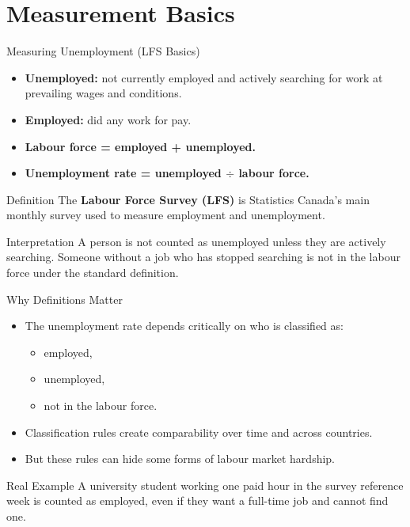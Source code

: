 \documentclass[aspectratio=169]{beamer}
\begin{document}
\section{Measurement Basics}

\begin{frame}{Measuring Unemployment (LFS Basics)}
\transfade
\begin{itemize}
  \item \textbf{Unemployed:} not currently employed and actively searching for work at prevailing wages and conditions.
  \item \textbf{Employed:} did any work for pay.
  \item \textbf{Labour force = employed + unemployed.}
  \item \textbf{Unemployment rate = unemployed \(\div\) labour force.}
\end{itemize}

\begin{block}{Definition}
The \textbf{Labour Force Survey (LFS)} is Statistics Canada's main monthly survey used to measure employment and unemployment.
\end{block}

\begin{block}{Interpretation}
A person is not counted as unemployed unless they are actively searching. Someone without a job who has stopped searching is not in the labour force under the standard definition.
\end{block}
\end{frame}

\begin{frame}{Why Definitions Matter}
\transfade
\begin{itemize}
  \item The unemployment rate depends critically on who is classified as:
  \begin{itemize}
    \item employed,
    \item unemployed,
    \item not in the labour force.
  \end{itemize}
  \item Classification rules create comparability over time and across countries.
  \item But these rules can hide some forms of labour market hardship.
\end{itemize}

\begin{exampleblock}{Real Example}
A university student working one paid hour in the survey reference week is counted as employed, even if they want a full-time job and cannot find one.
\end{exampleblock}
\end{frame}
\end{document}
